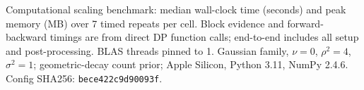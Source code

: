 \begin{table}[!htbp]
\centering
\caption{Computational scaling benchmark: median wall-clock time (seconds) and peak memory (MB)
over 7 timed repeats per cell. Block evidence and forward-backward timings are from direct
DP function calls; end-to-end includes all setup and post-processing. BLAS threads pinned
to 1. Gaussian family, $\nu=0$, $\rho^2=4$, $\sigma^2=1$; geometric-decay count prior;
Apple Silicon, Python 3.11, NumPy 2.4.6. Config SHA256: \texttt{bece422c9d90093f}.}
\label{tab:E10-scaling-paper}
\small

\end{table}
